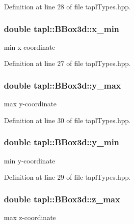 Definition at line 28 of file tapl\+Types.\+hpp.

\subsubsection[{\texorpdfstring{x\+\_\+min}{x_min}}]{\setlength{\rightskip}{0pt plus 5cm}double tapl\+::\+B\+Box3d\+::x\+\_\+min}\hypertarget{structtapl_1_1BBox3d_a7f28356e5e1f7503770b352c457d4aed}{}\label{structtapl_1_1BBox3d_a7f28356e5e1f7503770b352c457d4aed}
min x-\/coordinate 

Definition at line 27 of file tapl\+Types.\+hpp.

\subsubsection[{\texorpdfstring{y\+\_\+max}{y_max}}]{\setlength{\rightskip}{0pt plus 5cm}double tapl\+::\+B\+Box3d\+::y\+\_\+max}\hypertarget{structtapl_1_1BBox3d_ade66b3bf2e0dcf01b790d560826b64e1}{}\label{structtapl_1_1BBox3d_ade66b3bf2e0dcf01b790d560826b64e1}
max y-\/coordinate 

Definition at line 30 of file tapl\+Types.\+hpp.

\subsubsection[{\texorpdfstring{y\+\_\+min}{y_min}}]{\setlength{\rightskip}{0pt plus 5cm}double tapl\+::\+B\+Box3d\+::y\+\_\+min}\hypertarget{structtapl_1_1BBox3d_a63dd683fccb905aa43e3d363c0829581}{}\label{structtapl_1_1BBox3d_a63dd683fccb905aa43e3d363c0829581}
min y-\/coordinate 

Definition at line 29 of file tapl\+Types.\+hpp.

\subsubsection[{\texorpdfstring{z\+\_\+max}{z_max}}]{\setlength{\rightskip}{0pt plus 5cm}double tapl\+::\+B\+Box3d\+::z\+\_\+max}\hypertarget{structtapl_1_1BBox3d_a6b1ff639ba484bdcf6185d53870d623f}{}\label{structtapl_1_1BBox3d_a6b1ff639ba484bdcf6185d53870d623f}
max z-\/coordinate 

